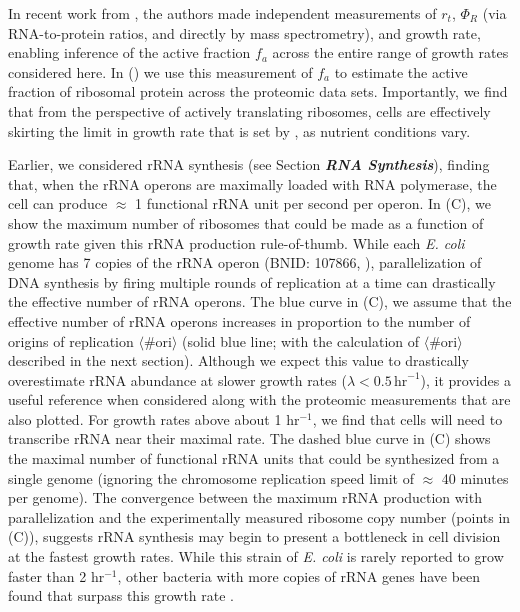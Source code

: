 In recent work from \cite{dai2016}, the authors made independent measurements of
$r_t$, $\Phi_R$ (via RNA-to-protein ratios, and directly by mass spectrometry),
and growth rate, enabling inference of the active fraction $f_a$ across the
entire range of growth rates considered here. In \FIG{}() we use this
measurement of $f_a$ to estimate the active fraction of ribosomal protein across
the proteomic data sets. Importantly, we find that from the perspective of
actively translating ribosomes, cells are effectively skirting the limit in
growth rate that is set by , as nutrient
conditions vary.


Earlier, we considered rRNA synthesis (see Section \textit{\bf RNA Synthesis}),
finding that, when the rRNA operons are maximally loaded with RNA polymerase,
the cell can produce $\approx$ 1 functional rRNA unit per second per operon. In
(C), we show the maximum number of ribosomes that could be
made as a function of growth rate given this rRNA production rule-of-thumb.
While each \textit{E. coli} genome has 7 copies of the rRNA operon (BNID:
107866, \cite{milo2010}), parallelization of DNA synthesis by firing multiple
rounds of replication at a time can drastically the effective number of rRNA
operons. The blue curve in (C), we assume that the effective
number of rRNA operons increases in proportion to the number of origins of
replication $\langle\text{\# ori}\rangle$ (solid blue line; with the calculation
of $\langle\text{\# ori}\rangle$ described in the next section). Although we
expect this value to drastically overestimate rRNA abundance at slower growth
rates ($\lambda < 0.5\, \text{hr}^{-1}$), it provides a useful reference when
considered along with the proteomic measurements that are also plotted. For
growth rates above about 1 hr$^{-1}$, we find that cells will need to transcribe
rRNA near their maximal rate.  The dashed blue curve in (C)
shows the maximal number of functional rRNA units that could be synthesized from
a single genome (ignoring the chromosome replication speed limit of $\approx$ 40
minutes per genome). The convergence between the maximum rRNA production with
parallelization and the experimentally measured ribosome copy number (points in
(C)), suggests rRNA synthesis may begin to present a
bottleneck in cell division at the fastest growth rates. While this strain of
\textit{E. coli} is rarely reported to grow faster than 2 hr$^{-1}$, other
bacteria with more copies of rRNA genes have been found that surpass this growth
rate \citep{bremer2008,roller2016}.
